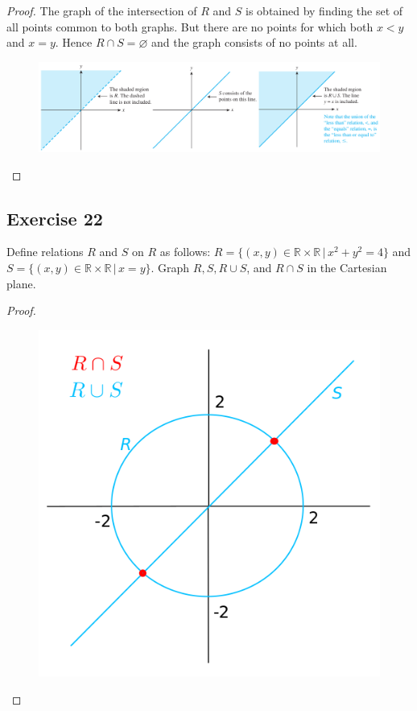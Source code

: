 \documentclass[14pt]{extarticle}
\newcommand{\es}{\varnothing}
\newcommand{\R}{\mathbb{R}}
\begin{document}
\begin{proof}
        The graph of the intersection of $R$ and $S$ is obtained by finding the set of all points common to both graphs. But
        there are no points for which both \(x < y\) and \(x = y\). Hence \(R \cap S = \es\) and the graph consists of no
        points at all.

        \begin{figure}[ht!]
                \centering
                \includegraphics[scale=0.35]{../images/8.1.21.png}
        \end{figure}
\end{proof}

\subsection{Exercise 22}
Define relations $R$ and $S$ on $R$ as follows: \(R = \{(x, y) \in \R \times \R \, | \, x^2 + y^2 = 4\}\) and
\(S = \{(x, y) \in \R \times \R \, | \, x = y\}\). Graph \(R, S, R \cup S\), and \(R \cap S\) in the Cartesian plane.

\begin{proof}
        \begin{figure}[ht!]
                \centering
                \includegraphics[scale=0.3]{../images/8.1.22.png}
        \end{figure}
\end{proof}
\end{document}
